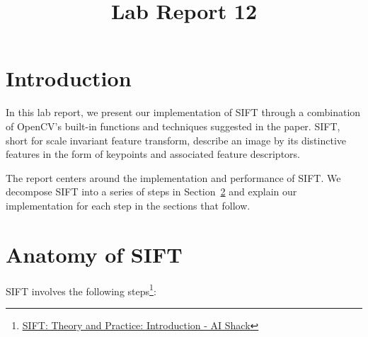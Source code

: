 \documentclass{ee208report}
\title{Lab Report 12}
\begin{document}
\begin{CJK}{UTF8}{gbsn}
    \maketitle
\end{CJK}

\begin{multicols*}{2}

\section{Introduction}

In this lab report, we present our implementation of
SIFT\cite{lowe2004distinctive} through a combination of OpenCV's built-in
functions and techniques suggested in the paper. SIFT, short for scale invariant
feature transform, describe an image by its distinctive features in the form of
keypoints and associated feature descriptors.

The report centers around the implementation and performance of SIFT. We decompose SIFT into a series of steps in Section~\ref{s:anatomy} and explain our implementation for each step in the sections that follow.

\section{Anatomy of SIFT}
\label{s:anatomy}

SIFT involves the following steps\footnote{\underline{\href{http://aishack.in/
tutorials/sift-scale-invariant-feature-transform-introduction/}{SIFT: Theory and
Practice: Introduction - AI Shack}}}:


\end{multicols*}
\end{document}
